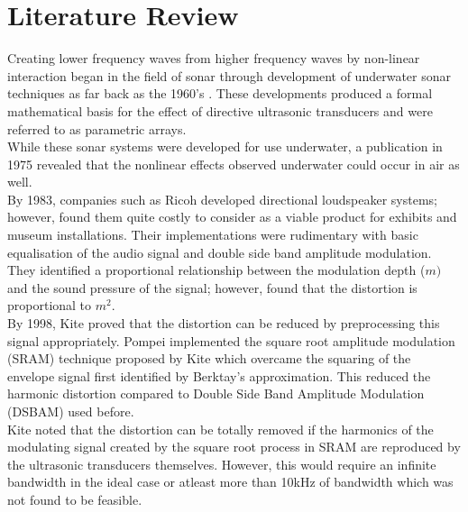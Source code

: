 \section{Literature Review}
Creating lower frequency waves from higher frequency waves by non-linear interaction began in the field of sonar through development of underwater sonar techniques as far back as the 1960's \cite{westervelt_1963}. These developments produced a formal mathematical basis for the effect of directive ultrasonic transducers and were referred to as parametric arrays.\\
While these sonar systems were developed for use underwater, a publication in 1975 \cite{bennett_blackstock_1975} revealed that the nonlinear effects observed underwater could occur in air as well.\\
By 1983, companies such as Ricoh \cite{yoneyama_fujimoto_kawamo_sasabe_1983} developed directional loudspeaker systems; however, found them quite costly to consider as a viable product for exhibits and museum installations. Their implementations were rudimentary with basic equalisation of the audio signal and double side band amplitude modulation. They identified a proportional relationship between the modulation depth ($m)$ and the sound pressure of the signal; however, found that the distortion is proportional to $m^2$.\\
By 1998, Kite \cite{kite_post_hamilton_1998} proved that the distortion can be reduced by preprocessing this signal appropriately. Pompei \cite{pompei2002sound} implemented the square root amplitude modulation (SRAM) technique proposed by Kite which overcame the squaring of the envelope signal first identified by Berktay's approximation. This reduced the harmonic distortion compared to Double Side Band Amplitude Modulation (DSBAM) used before.\\
Kite \cite{kite_post_hamilton_1998} noted that the distortion can be totally removed if the harmonics of the modulating signal created by the square root process in SRAM are reproduced by the ultrasonic transducers themselves. However, this would require an infinite bandwidth in the ideal case or atleast more than 10kHz of bandwidth which was not found to be feasible.\\
